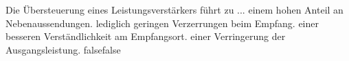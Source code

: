     {Die Übersteuerung eines Leistungsverstärkers führt zu ...}
    {einem hohen Anteil an Nebenaussendungen.}
    {lediglich geringen Verzerrungen beim Empfang.}
    {einer besseren Verständlichkeit am Empfangsort.}
    {einer Verringerung der Ausgangsleistung.}
    {false}{false}
